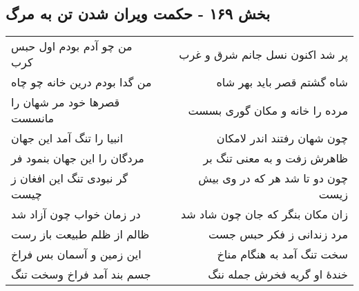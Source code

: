 \begin{center}
\section*{بخش ۱۶۹ - حکمت ویران شدن تن به مرگ}
\label{sec:sh169}
\begin{longtable}{l p{0.5cm} r}
من چو آدم بودم اول حبس کرب
&&
پر شد اکنون نسل جانم شرق و غرب
\\
من گدا بودم درین خانه چو چاه
&&
شاه گشتم قصر باید بهر شاه
\\
قصرها خود مر شهان را مانسست
&&
مرده را خانه و مکان گوری بسست
\\
انبیا را تنگ آمد این جهان
&&
چون شهان رفتند اندر لامکان
\\
مردگان را این جهان بنمود فر
&&
ظاهرش زفت و به معنی تنگ بر
\\
گر نبودی تنگ این افغان ز چیست
&&
چون دو تا شد هر که در وی بیش زیست
\\
در زمان خواب چون آزاد شد
&&
زان مکان بنگر که جان چون شاد شد
\\
ظالم از ظلم طبیعت باز رست
&&
مرد زندانی ز فکر حبس جست
\\
این زمین و آسمان بس فراخ
&&
سخت تنگ آمد به هنگام مناخ
\\
جسم بند آمد فراخ وسخت تنگ
&&
خندهٔ او گریه فخرش جمله ننگ
\\
\end{longtable}
\end{center}
